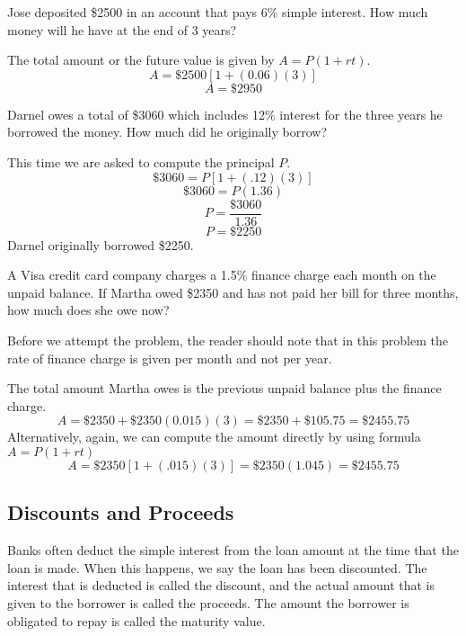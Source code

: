 \begin{example}
    Jose deposited \$2500 in an account that pays 6\% simple interest. How much money will he have at the end of 3 years?
\end{example}

\begin{solution}
    The total amount or the future value is given by \( A = P(1 + rt) \).
    \[ A = \$2500[1 + (0.06)(3)] \]
    \[ A = \$2950 \]
\end{solution}

\begin{example}
    Darnel owes a total of \$3060 which includes 12\% interest for the three years he borrowed the money. How much did he originally borrow?
\end{example}
\begin{solution}
    This time we are asked to compute the principal \( P \).
    \[ \$3060 = P[1 + (.12)(3)] \]
    \[ \$3060 = P(1.36) \]
    \[ P = \frac{\$3060}{1.36} \]
    \[ P = \$2250 \]
    Darnel originally borrowed \$2250.
\end{solution}

\begin{example}
    A Visa credit card company charges a 1.5\% finance charge each month on the unpaid balance. If Martha owed \$2350 and has not paid her bill for three months, how much does she owe now?
\end{example}
\begin{solution}
    Before we attempt the problem, the reader should note that in this problem the rate of finance charge is given per month and not per year.

    The total amount Martha owes is the previous unpaid balance plus the finance charge.
    \[ A = \$2350 + \$2350(0.015)(3) = \$2350 + \$105.75 = \$2455.75 \]
    Alternatively, again, we can compute the amount directly by using formula \( A = P(1 + rt) \)
    \[ A = \$2350[1 + (.015)(3)] = \$2350(1.045) = \$2455.75 \]
\end{solution}

\subsection{Discounts and Proceeds}
Banks often deduct the simple interest from the loan amount at the time that the loan is made.  When this happens, we say the loan has been discounted.  The interest that is deducted is called the discount, and the actual amount that is given to the borrower is called the proceeds.  The amount the borrower is obligated to repay is called the maturity value.


